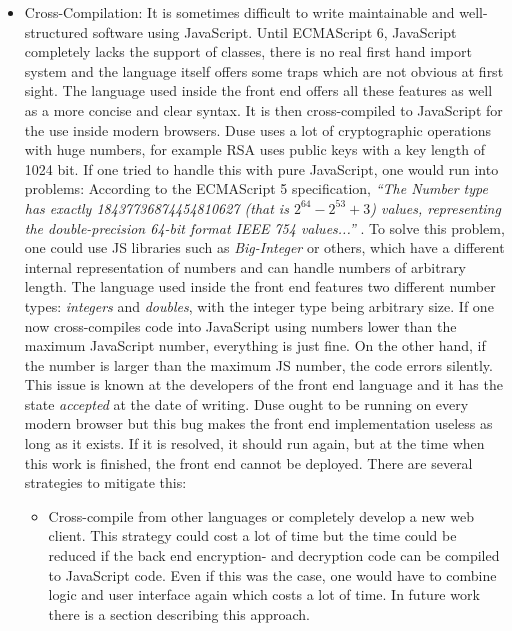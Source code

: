 \begin{itemize}
  \item Cross-Compilation: It is sometimes difficult to write maintainable and
  well-structured software using JavaScript. Until ECMAScript 6, JavaScript
  completely lacks the support of classes, there is no real first hand import
  system and the language itself offers some traps which are not obvious at
  first sight. The language used inside the front end offers all these features
  as well as a more concise and clear syntax. It is then cross-compiled to
  JavaScript for the use inside modern browsers.
  Duse uses a lot of cryptographic operations with huge numbers, for example
  RSA uses public keys with a key length of 1024 bit. If one tried to handle
  this with pure JavaScript, one would run into problems: According to the
  ECMAScript 5 specification, \cite[p. 29]{ecmascriptfive} \textit{
  ``The Number type has exactly 18437736874454810627 (that is $2^{64}-2^{53}+3$)
  values, representing the double-precision 64-bit format IEEE 754 values...''
  }. To solve this problem, one could use JS libraries such as \textit{Big-Integer}
  or others, which have a different internal representation of numbers and
  can handle numbers of arbitrary length.
  The language used inside the front end features two different number types:
  \textit{integers} and \textit{doubles}, with the integer type being arbitrary
  size. If one now cross-compiles code into JavaScript using numbers lower than
  the maximum JavaScript number, everything is just fine. On the other hand,
  if the number is larger than the maximum JS number, the code errors silently.
  This issue is known at the developers of the front end language and it
  has the state \textit{accepted} at the date of writing. Duse ought to be
  running on every modern browser but this bug makes the front end implementation
  useless as long as it exists. If it is resolved, it should run again, but
  at the time when this work is finished, the front end cannot be deployed.
  There are several strategies to mitigate this:
  \begin{itemize}
    \item Cross-compile from other languages or completely develop a new
    web client. This strategy could cost a lot of time but the time could
    be reduced if the back end encryption- and decryption code can be
    compiled to JavaScript code. Even if this was the case, one would have
    to combine logic and user interface again which costs a lot of time.
    In future work there is a section describing this approach.


\end{itemize}
\end{itemize}

